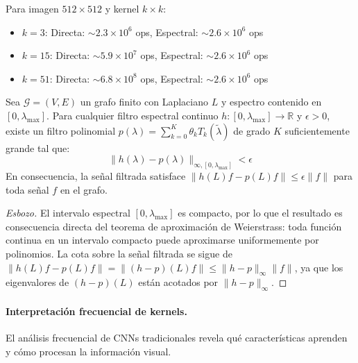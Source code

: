 \begin{example}\label{ex:eficiencia_practica}
Para imagen $512 \times 512$ y kernel $k \times k$:
\begin{itemize}
    \item $k = 3$: Directa: $\sim 2.3 \times 10^6$ ops, Espectral: $\sim 2.6 \times 10^6$ ops
    \item $k = 15$: Directa: $\sim 5.9 \times 10^7$ ops, Espectral: $\sim 2.6 \times 10^6$ ops
    \item $k = 51$: Directa: $\sim 6.8 \times 10^8$ ops, Espectral: $\sim 2.6 \times 10^6$ ops
\end{itemize}
\end{example}

\begin{theorem}\label{thm:aproximacion_universal_espectral}
Sea $\mathcal{G} = (V, E)$ un grafo finito con Laplaciano $L$ y espectro contenido en $[0, \lambda_{\max}]$. Para cualquier filtro espectral continuo $h: [0, \lambda_{\max}] \to \mathbb{R}$ y $\epsilon > 0$, existe un filtro polinomial $p(\lambda) = \sum_{k=0}^{K} \theta_k T_k(\tilde{\lambda})$ de grado $K$ suficientemente grande tal que:
\begin{equation}
\|h(\lambda) - p(\lambda)\|_{\infty, [0, \lambda_{\max}]} < \epsilon
\end{equation}
En consecuencia, la señal filtrada satisface $\|h(L)f - p(L)f\| \leq \epsilon \|f\|$ para toda señal $f$ en el grafo.
\end{theorem}

\begin{proof}[Esbozo]
El intervalo espectral $[0, \lambda_{\max}]$ es compacto, por lo que el resultado es consecuencia directa del teorema de aproximación de Weierstrass: toda función continua en un intervalo compacto puede aproximarse uniformemente por polinomios. La cota sobre la señal filtrada se sigue de $\|h(L)f - p(L)f\| = \|(h-p)(L)f\| \leq \|h - p\|_\infty \|f\|$, ya que los eigenvalores de $(h-p)(L)$ están acotados por $\|h-p\|_\infty$.
\end{proof}

\paragraph{Interpretación frecuencial de kernels.} El análisis frecuencial de CNNs tradicionales revela qué características aprenden y cómo procesan la información visual.

